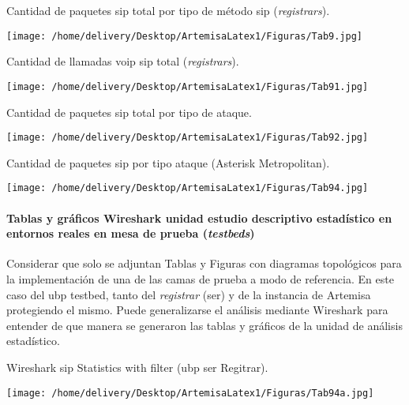 \documentclass[a4paper,12pt]{report}
\begin{document}
\begin{table}[h!]
\caption{Cantidad de paquetes \ac{sip} total por tipo de método \ac{sip}
(\emph{registrars}).}
\centering
\texttt{[image: /home/delivery/Desktop/ArtemisaLatex1/Figuras/Tab9.jpg]}
\end{table}

\begin{table}[h!]
\caption{Cantidad de llamadas \ac{voip} \ac{sip} total (\emph{registrars}).}
\centering
\texttt{[image: /home/delivery/Desktop/ArtemisaLatex1/Figuras/Tab91.jpg]}
\end{table}

\begin{table}[h!]
\caption{Cantidad de paquetes \ac{sip} total por tipo de ataque.}
\centering
\texttt{[image: /home/delivery/Desktop/ArtemisaLatex1/Figuras/Tab92.jpg]}
\end{table}

\begin{table}[h!]
\caption{Cantidad de paquetes \ac{sip} por tipo ataque (Asterisk Metropolitan).}
\centering
\texttt{[image: /home/delivery/Desktop/ArtemisaLatex1/Figuras/Tab94.jpg]}
\end{table}

\clearpage

\paragraph{Tablas y gráficos Wireshark unidad estudio descriptivo
estadístico en entornos reales en mesa de prueba (\emph{testbeds})\\}

Considerar que solo se adjuntan Tablas y Figuras con diagramas topológicos para la implementación de
una de las camas de prueba a modo de referencia. En este caso del \ac{ubp} testbed,
tanto del \emph{registrar} (\ac{ser}) y de la instancia de Artemisa protegiendo el mismo.
Puede generalizarse el análisis mediante Wireshark para entender de que manera
se generaron las tablas y gráficos de la unidad de análisis estadístico.

\begin{table}[h!]
\caption{Wireshark \ac{sip} Statistics with filter (\ac{ubp} \ac{ser} Regitrar).}
\centering
\texttt{[image: /home/delivery/Desktop/ArtemisaLatex1/Figuras/Tab94a.jpg]}
\end{table}
\end{document}

